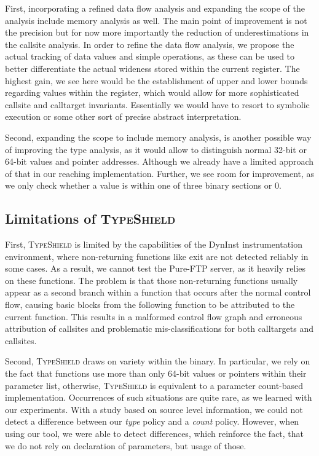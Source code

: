 First, incorporating a refined data flow analysis and 
expanding the scope of the analysis include memory analysis as well. The main point of improvement is not the precision but for now 
more importantly the reduction of underestimations in the callsite analysis.
In order to refine the data flow analysis, we propose the actual tracking of data values and simple operations, as these
can be used to better differentiate the actual wideness stored within the current register. The highest gain, 
we see here would be the establishment of upper and lower bounds regarding values within the register, which 
would allow for more sophisticated callsite and calltarget invariants. Essentially we would have to resort 
to symbolic execution or some other sort of precise abstract interpretation.

Second, expanding the scope to include memory analysis, is another possible way of improving the type analysis, as it 
would allow to distinguish normal 32-bit or 64-bit values and pointer addresses. Although we already have a 
limited approach of that in our reaching implementation. Further, we see room for improvement, as we only check
whether a value is within one of three binary sections or 0.

\subsection{Limitations of \textsc{TypeShield}}
\label{section:limit}
First, \textsc{TypeShield} is limited by the capabilities of the DynInst instrumentation environment, where non-returning functions like exit are 
not detected reliably in some cases. As a result, we cannot test the Pure-FTP server, as it heavily relies on these functions. 
The problem is that those non-returning functions usually appear as a second branch within a function that occurs after the normal 
control flow, causing basic blocks from the following function to be attributed to the current function. This results in a malformed 
control flow graph and erroneous attribution of callsites and problematic mis-classifications for both calltargets and callsites.

Second, \textsc{TypeShield} draws on variety within the binary. In particular, we rely on the fact that functions use more than only 
64-bit values or pointers within their parameter list, otherwise, \textsc{TypeShield} is equivalent to a parameter count-based implementation. 
Occurrences of such situations are quite rare, as we learned with our experiments. With a study based on source level information, we could not 
detect a difference between our \textit{type} policy and a \textit{count} policy. However, when using our tool, we were able to detect differences,
which reinforce the fact, that we do not rely on declaration of parameters, but usage of those.

